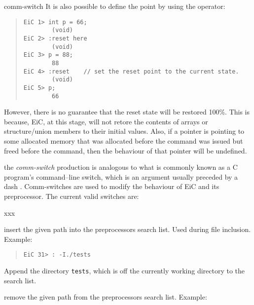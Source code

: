\begin{Ventry}{comm-switch }
	It is also possible to define the  point by using the
	 operator:

\begin{quote}
\begin{verbatim}
EiC 1> int p = 66;
        (void)
EiC 2> :reset here
        (void)
EiC 3> p = 88;
        88
EiC 4> :reset    // set the reset point to the current state.
        (void)
EiC 5> p;
        66
\end{verbatim}
\end{quote}

	However, there is no guarantee that the reset state will be
	restored 100\%.  This is because, EiC, at this stage, will not
	retore the contents of arrays or structure/union members to
	their initial values. Also, if a pointer is pointing to some
	allocated memory that was allocated before the 
	command was issued but freed before the  command,
	then the behaviour of that pointer will be undefined.

\item[comm-switch] 
\label{item:comm-switch} 
        the {\it comm-switch\label{comm-switch}} 
        production is analogous
        to what is commonly known as a C program's command--line switch, which
        is an argument usually preceded by a dash \T{-}. Comm-switches are 
        used to modify
        the behaviour of EiC and its preprocessor. 
        The current valid switches are:

        \begin{Ventry}{xxx}
        \item[I]          
        insert the given path into the preprocessors search list. 
                Used during file inclusion. Example:

\begin{quote}
\begin{verbatim}
EiC 31> : -I./tests
\end{verbatim}
\end{quote}


        Append the directory {\tt tests}, which is off the currently
        working directory to the search list.

        \item[R]           
        
        remove the given path from the preprocessors search list.
                Example:


\end{Ventry}
\end{Ventry}
